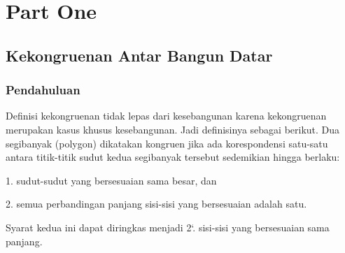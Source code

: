 \documentclass[11pt,fleqn]{book} %
\begin{document}


\pagestyle{empty} %

\tableofcontents %

\cleardoublepage %

\pagestyle{fancy} %


\part{Part One}



\chapter{Kekongruenan Antar Bangun Datar}

\section{Pendahuluan}

Definisi kekongruenan tidak lepas dari kesebangunan karena kekongruenan
merupakan kasus khusus kesebangunan. Jadi definisinya sebagai berikut.
Dua segibanyak (polygon) dikatakan kongruen jika ada korespondensi satu-satu
antara titik-titik sudut kedua segibanyak tersebut sedemikian hingga berlaku: 

1. sudut-sudut yang bersesuaian sama besar, dan

2. semua perbandingan panjang sisi-sisi yang bersesuaian adalah satu.

Syarat kedua ini dapat diringkas menjadi 2`. sisi-sisi yang bersesuaian sama panjang. 
\end{document}
